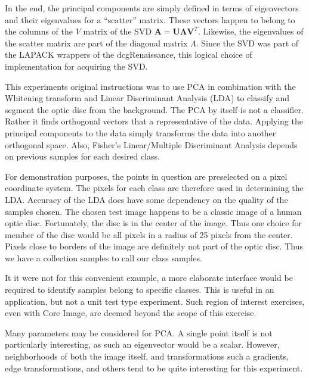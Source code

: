 \documentclass[12pt]{report}
\begin{document}
In the end, the principal components are simply defined in terms of eigenvectors and their eigenvalues for a ``scatter'' matrix.  These vectors happen to belong to the columns of the $V$ matrix of the SVD $\mathbf{A} = \mathbf{U\Lambda V}^T$.  Likewise, the eigenvalues of the scatter matrix are part of the diagonal matrix $\Lambda$.  Since the SVD was part of the LAPACK wrappers of the dcgRenaissance, this logical choice of implementation for acquiring the SVD.  

This experiments original instructions was to use PCA  in combination with the Whitening transform and Linear Discriminant Analysis (LDA) to classify and segment the optic disc from the background.   The PCA by itself is not a classifier.  Rather it finds orthogonal vectors that a representative of the data.  Applying the principal components to the data simply transforms the data into another orthogonal space.  Also, Fisher's Linear/Multiple Discriminant Analysis depends on previous samples for each desired class.   

For demonstration purposes, the points in question are preselected on a pixel coordinate system.  The pixels for each class are therefore used in determining the LDA.  Accuracy of the LDA does have some dependency on the quality of the samples chosen.  The chosen test image happens to be a classic image of a human optic disc.  Fortunately, the disc is in the center of the image.  Thus one choice for member of the disc would be all pixels in a radius of 25 pixels from the center.  Pixels close to borders of the image are definitely not part of the optic disc.  Thus we have a collection samples to call our class samples.  

It it were not for this convenient example, a more elaborate interface would be required to identify samples belong to specific classes.  This is useful in an application, but not a unit test type experiment.  Such region of interest exercises, even with Core Image, are deemed beyond the scope of this exercise.  

Many parameters may be considered for PCA.  A single point itself is not particularly interesting, as such an eigenvector would be a scalar.  However, neighborhoods of both the image itself, and transformations such a gradients, edge transformations, and others tend to be quite interesting for this experiment.  
\end{document}
